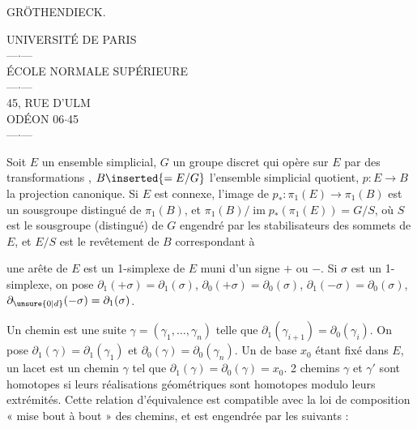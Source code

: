 

GRÖTHENDIECK.

\begin{center}
UNIVERSITÉ DE PARIS\\
---$\cdot$---\\
ÉCOLE NORMALE SUPÉRIEURE\\
---$\cdot$---\\
45, RUE D'ULM\\
ODÉON 06$\cdot$45\\
---$\cdot$---
\end{center}

 Soit $E$ un ensemble simplicial,  $G$ un groupe discret qui opère sur $E$ par des transformations , $B\inserted{=E/G}$ l'ensemble simplicial quotient,  $p:E\to B$ la projection canonique. Si $E$ est connexe, l'image de $p_*:\pi_1(E)\longrightarrow\pi_1(B)$ est un sousgroupe distingué de $\pi_1(B)$, et $\pi_1(B)/\operatorname{im}p_*(\pi_1(E))=G/S$, où $S$ est le sousgroupe (distingué) de $G$ engendré par les stabilisateurs des sommets de $E$, et $E/S$ est le revêtement  de $B$ correspondant à 

 une arête de $E$ est un 1-simplexe de $E$ muni d'un signe $+$ ou $-$. Si $\sigma$ est un 1-simplexe, on pose $\partial_1(+\sigma)=\partial_1(\sigma)$, $\partial_0(+\sigma)=\partial_0(\sigma)$, $\partial_1(-\sigma)=\partial_0(\sigma)$, $\partial_{\unsure{0|d}}(-\sigma)=\partial_1(\sigma)$.

Un chemin est une suite  $\gamma=(\gamma_1,\ldots,\gamma_n)$ telle que $\partial_1(\gamma_{i+1})=\partial_0(\gamma_i)$. On pose $\partial_1(\gamma)=\partial_1(\gamma_1)$ et $\partial_0(\gamma)=\partial_0(\gamma_n)$. Un   de base $x_0$ étant fixé dans $E$, un lacet est un chemin $\gamma$ tel que $\partial_1(\gamma)=\partial_0(\gamma)=x_0$. 2 chemins $\gamma$ et $\gamma'$ sont homotopes si leurs réalisations géométriques sont homotopes modulo leurs extrémités. Cette relation d'équivalence est compatible avec la loi de composition « mise bout à bout » des chemins, et est engendrée par les suivants :


